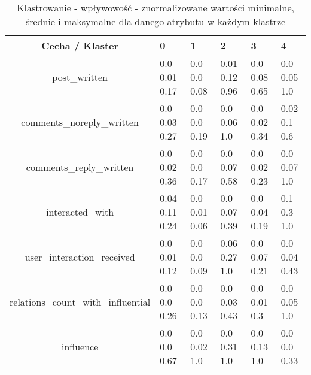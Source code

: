 \documentclass[polish,12pt]{aghthesis}
\begin{document}
\begin{table}[ht]
    \centering
  \begin{center}
\begin{tabular}{ |c|M{1cm}|M{1cm}|M{1cm}|M{1cm}|M{1cm}| } 
\hline
 Cecha / Klaster & 0 & 1 & 2 & 3 & 4 \\ [0.5ex] 
 \hline
post\_written & 0.0 0.01 0.17 & 0.0 0.0 0.08 & 0.01 0.12 0.96 & 0.0 0.08 0.65 & 0.0 0.05 1.0 \\ 
\hline
comments\_noreply\_written & 0.0 0.03 0.27 & 0.0 0.0 0.19 & 0.0 0.06 1.0 & 0.0 0.02 0.34 & 0.02 0.1 0.6 \\ 
\hline
comments\_reply\_written & 0.0 0.02 0.36 & 0.0 0.0 0.17 & 0.0 0.07 0.58 & 0.0 0.02 0.23 & 0.0 0.07 1.0 \\ 
\hline
interacted\_with & 0.04 0.11 0.24 & 0.0 0.01 0.06 & 0.0 0.07 0.39 & 0.0 0.04 0.19 & 0.1 0.3 1.0 \\ 
\hline
user\_interaction\_received & 0.0 0.01 0.12 & 0.0 0.0 0.09 & 0.06 0.27 1.0 & 0.0 0.07 0.21 & 0.0 0.04 0.43 \\ 
\hline
relations\_count\_with\_influential & 0.0 0.0 0.26 & 0.0 0.0 0.13 & 0.0 0.03 0.43 & 0.0 0.01 0.3 & 0.0 0.05 1.0 \\ 
\hline
influence & 0.0 0.0 0.67 & 0.0 0.02 1.0 & 0.0 0.31 1.0 & 0.0 0.13 1.0 & 0.0 0.0 0.33 \\ 
\hline
\end{tabular}
\end{center}
\caption{Klastrowanie - wpływowość - znormalizowane wartości minimalne, średnie i maksymalne dla danego atrybutu w każdym klastrze}
\label{tab:i_m}
\end{table}
\end{document}
